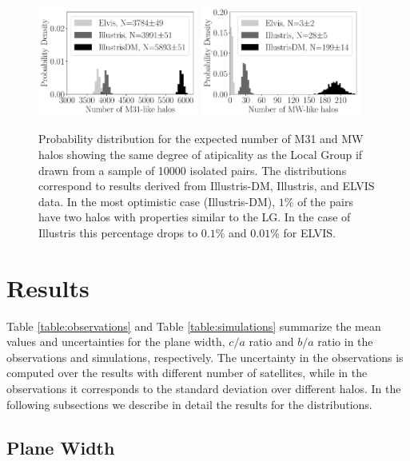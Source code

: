 \documentclass[a4paper,fleqn,usenatbib]{mnras}
\begin{document}
\begin{figure}
\centering
\includegraphics[width=0.47\textwidth]{expected_numbers_n_M31.pdf}
\includegraphics[width=0.47\textwidth]{expected_numbers_n_MW.pdf}
\caption{Probability distribution for the expected number of M31 and
  MW halos  showing the same degree of atipicality as the Local Group if drawn
  from a sample of 10000 isolated pairs. 
  The distributions correspond to results derived from Illustris-DM, Illustris,
  and ELVIS data.
  In the most optimistic case (Illustris-DM), $1\%$ of the pairs have
  two halos with properties similar to the LG. In the case of
  Illustris this percentage drops to $0.1\%$ and $0.01\%$ for ELVIS.
\label{fig:expected_number}}
\end{figure}

\section{Results}
\label{sec:results}

Table \ref{table:observations} and Table \ref{table:simulations}
summarize the mean values and uncertainties for the plane width, $c/a$
ratio and $b/a$ ratio in the observations and simulations, respectively. 
The uncertainty in the observations is computed over the results with
different number of satellites, while in the observations it
corresponds to the standard deviation over different halos. 
In the following subsections we describe in detail the results for the
distributions. 

\subsection{Plane Width}
\end{document}

